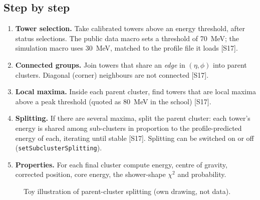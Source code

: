 \documentclass[11pt,letterpaper]{article}
\begin{document}
\subsection{Step by step}
\begin{enumerate}
\item \textbf{Tower selection.} Take calibrated towers above an energy threshold, after status selections. The public data macro sets a threshold of 70~MeV;
the simulation macro uses 30~MeV, matched to the profile file it loads [S17].
\item \textbf{Connected groups.} Join towers that share an \emph{edge} in $(\eta,\phi)$ into parent clusters. Diagonal (corner) neighbours are not connected [S17].
\item \textbf{Local maxima.} Inside each parent cluster, find towers that are local maxima above a peak threshold (quoted as 80~MeV in the school) [S17].
\item \textbf{Splitting.} If there are several maxima, split the parent cluster: each tower's energy is shared among sub-clusters in proportion to the profile-predicted energy of each, iterating until stable [S17].
Splitting can be switched on or off (\texttt{setSubclusterSplitting}).
\item \textbf{Properties.} For each final cluster compute energy, centre of gravity, corrected position, core energy, the shower-shape $\chi^2$ and probability.
\end{enumerate}

\begin{figure}[h]\centering
{}
\caption{Toy illustration of parent-cluster splitting (own drawing, not data).}\label{fig:split}
\end{figure}
\end{document}

